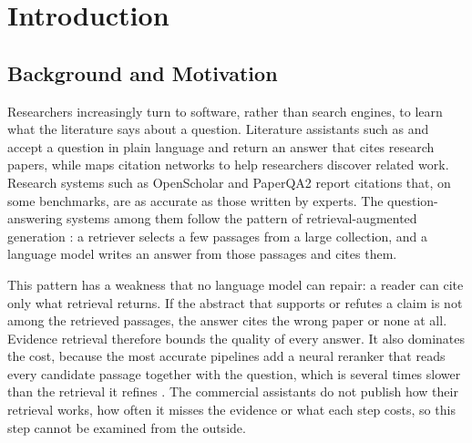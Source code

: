 \section{Introduction}
\label{sec:introduction}

\subsection{Background and Motivation}
\label{sec:motivation}

Researchers increasingly turn to software, rather than search engines, to learn what the
literature says about a question. Literature assistants such as \textcite{scispace} and
\textcite{consensus} accept a question in plain language and return an answer that cites
research papers, while \textcite{researchrabbit} maps citation networks to help researchers
discover related work. Research systems such as OpenScholar \parencite{asai2026openscholar}
and PaperQA2 \parencite{skarlinski2024paperqa} report citations that, on some benchmarks, are
as accurate as those written by experts. The question-answering systems among them follow the
pattern of retrieval-augmented generation \parencite{lewis2020rag}: a retriever selects a few
passages from a large collection, and a language model writes an answer from those passages
and cites them.

This pattern has a weakness that no language model can repair: a reader can cite only what
retrieval returns. If the abstract that supports or refutes a claim is not among the retrieved
passages, the answer cites the wrong paper or none at all. Evidence retrieval therefore bounds
the quality of every answer. It also dominates the cost, because the most accurate pipelines
add a neural reranker that reads every candidate passage together with the question, which is
several times slower than the retrieval it refines \parencite{nogueira2019passage}. The
commercial assistants do not publish how their retrieval works, how often it misses the
evidence or what each step costs, so this step cannot be examined from the outside.

